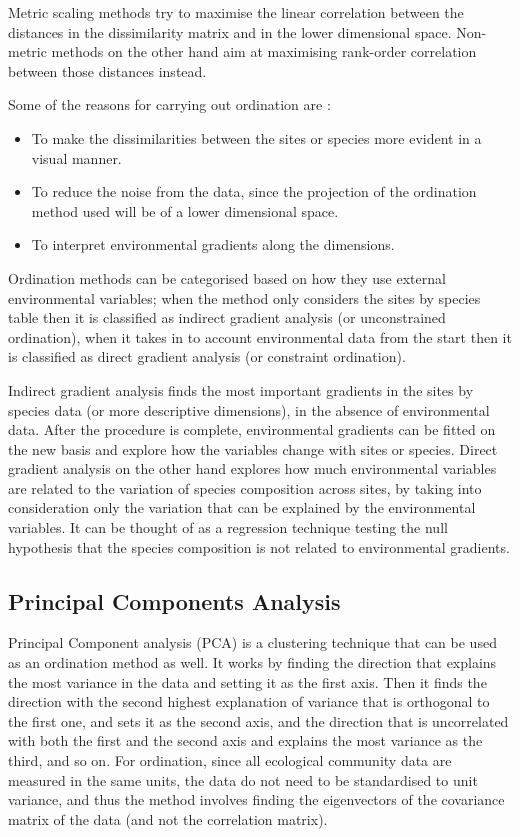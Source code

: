 Metric scaling methods try to maximise the linear correlation between the distances in the dissimilarity matrix and in the lower dimensional space. Non-metric methods on the other hand aim at maximising rank-order correlation between those distances instead.

Some of the reasons for carrying out ordination are :
\begin{itemize}
\item To make the dissimilarities between the sites or species more evident in a visual manner.
\item To reduce the noise from the data, since the projection of the ordination method used will be of a lower dimensional space.
\item To interpret environmental gradients along the dimensions.
\end{itemize}


Ordination methods can be categorised based on how they use external environmental variables; when the method only considers the sites by species table then it is classified as indirect gradient analysis (or unconstrained ordination), when it takes in to account environmental data from the start then it is classified as direct gradient analysis (or constraint ordination). 

Indirect gradient analysis finds the most important gradients in the sites by species data (or more descriptive dimensions), in the absence of environmental data. After the procedure is complete, environmental gradients can be fitted on the new basis and explore how the variables change with sites or species. Direct gradient analysis on the other hand explores how much environmental variables are related to the variation of species composition across sites, by taking into consideration only the variation that can be explained by the environmental variables. It can be thought of as a regression technique testing the null hypothesis that the species composition is not related to environmental gradients.

\subsection{Principal Components Analysis}
\label{ssec:PCA}
Principal Component analysis (PCA) is a clustering technique that can be used as an ordination method as well. It works by finding the direction that explains the most variance in the data and setting it as the first axis. Then it finds the direction with the second highest explanation of variance that is orthogonal to the first one, and sets it as the second axis, and the direction that is uncorrelated with both the first and the second axis and explains the most variance as the third, and so on. For ordination, since all ecological community data are measured in the same units, the data do not need to be standardised to unit variance, and thus the method involves finding the eigenvectors of the covariance matrix of the data (and not the correlation matrix).

